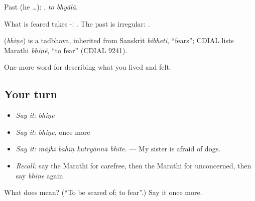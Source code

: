 Past (he …):  , \emph{to bhyālā}.

What is feared takes -:  . The past is irregular:  .

\begin{cousinweb}
\textbf{} (\emph{bhiṇe}) is a tadbhava, inherited from Sanskrit \emph{bibheti}, \textquotedblleft{}fears\textquotedblright{}; CDIAL lists Marathi \emph{bhiṇẽ}, \textquotedblleft{}to fear\textquotedblright{} (CDIAL 9241).
\end{cousinweb}

\begin{grammarlens}[title={What you've built}]
One more word for describing what you lived and felt.
\end{grammarlens}

\subsection*{Your turn}
\begin{itemize}
\raggedright
  \item \emph{Say it:} \emph{bhiṇe}
  \item \emph{Say it:} \emph{bhiṇe}, once more
  \item \emph{Say it:} \emph{mājhī bahīṇ kutryānnā bhite.} — My sister is afraid of dogs.
  \item \emph{Recall:} say the Marathi for carefree, then the Marathi for unconcerned, then say \emph{bhiṇe} again
\end{itemize}

\begin{tcolorbox}[breakable,colback=teal!4,colframe=teal!35!black,title={Before you move on}]
What does  mean? (\textquotedblleft{}To be scared of; to fear\textquotedblright{}.) Say it once more.
\end{tcolorbox}
